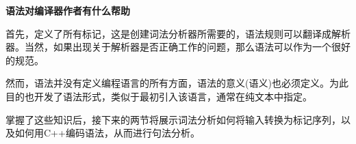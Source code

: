 \hspace*{\fill} \par %
\textbf{语法对编译器作者有什么帮助}

首先，定义了所有标记，这是创建词法分析器所需要的，语法规则可以翻译成解析器。当然，如果出现关于解析器是否正确工作的问题，那么语法可以作为一个很好的规范。\par

然而，语法并没有定义编程语言的所有方面，语法的意义(语义)也必须定义。为此目的也开发了语法形式，类似于最初引入该语言，通常在纯文本中指定。\par

掌握了这些知识后，接下来的两节将展示词法分析如何将输入转换为标记序列，以及如何用C++编码语法，从而进行句法分析。\par

























